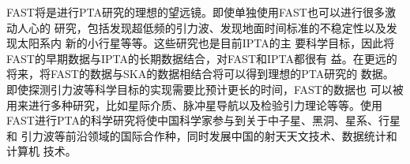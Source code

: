 FAST将是进行PTA研究的理想的望远镜。即使单独使用FAST也可以进行很多激动人心的
研究，包括发现超低频的引力波、发现地面时间标准的不稳定性以及发现太阳系内
新的小行星等等。这些研究也是目前IPTA的主
要科学目标，因此将FAST的早期数据与IPTA的长期数据结合，对FAST和IPTA都很有
益。在更远的将来，将FAST的数据与SKA的数据相结合将可以得到理想的PTA研究的
数据。即使探测引力波等科学目标的实现需要比预计更长的时间，FAST的数据也
可以被用来进行多种研究，比如星际介质、脉冲星导航以及检验引力理论等等。使用
FAST进行PTA的科学研究将使中国科学家参与到关于中子星、黑洞、星系、行星和
引力波等前沿领域的国际合作种，同时发展中国的射天天文技术、数据统计和计算机
技术。


\pkuthssffaq

